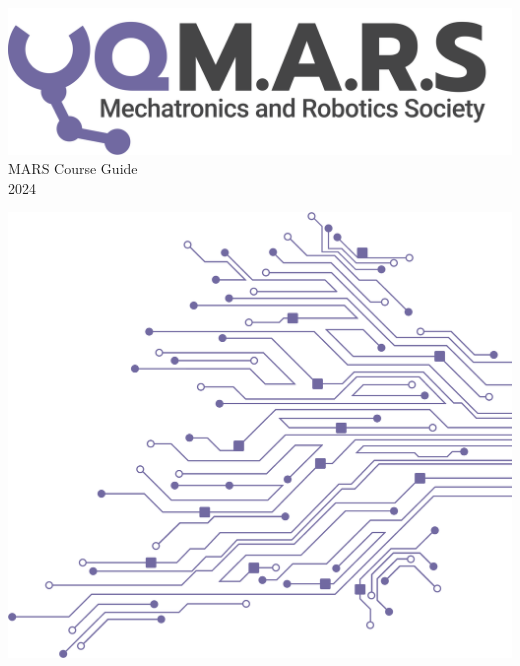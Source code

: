 \documentclass[a4paper,12pt]{report}
\begin{document}
\begin{titlepage}
    \begin{center}
        \vspace*{15mm}
        \includegraphics[width=0.7\paperwidth]{../Assets/Logo (Dark).png} \\
        \vspace{1cm}
        \Huge MARS Course Guide \\
        \huge \textcolor{turbo_purple}{2024}
    \end{center}
    \vfill
    \includegraphics[height=0.5\paperheight, right]{../Assets/Pattern - PCB (Solid).png}
    \vspace*{10mm}
\end{titlepage}
\restoregeometry
\newpage
\tableofcontents













%


\end{document}
